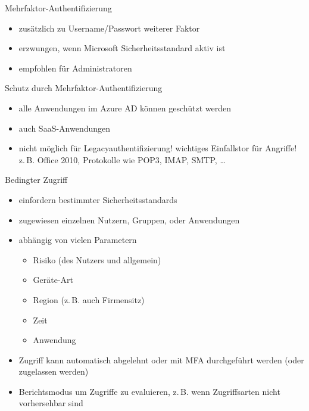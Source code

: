 
\begin{flashcard}[Definition]{Mehrfaktor-Authentifizierung}
  \begin{itemize}
    \item zusätzlich zu Username/Passwort weiterer Faktor
    \item erzwungen, wenn Microsoft Sicherheitsstandard aktiv ist
    \item empfohlen für Administratoren
  \end{itemize}
\end{flashcard}

\begin{flashcard}[Definition]{Schutz durch Mehrfaktor-Authentifizierung}
  \begin{itemize}
    \item alle Anwendungen im Azure AD können geschützt werden
    \item auch SaaS-Anwendungen
    \item nicht möglich für Legacyauthentifizierung!\newline
    wichtiges Einfallstor für Angriffe!\newline
    z.\,B. Office 2010, Protokolle wie POP3, IMAP, SMTP, \ldots
  \end{itemize}
\end{flashcard}

\begin{flashcard}[Definition]{Bedingter Zugriff}
  \begin{itemize}
    \item einfordern bestimmter Sicherheitsstandards
    \item zugewiesen einzelnen Nutzern, Gruppen, oder Anwendungen
    \item abhängig von vielen Parametern
      \begin{itemize}
        \item Risiko (des Nutzers und allgemein)
        \item Geräte-Art
        \item Region (z.\,B. auch Firmensitz)
        \item Zeit
        \item Anwendung
      \end{itemize}
    \item Zugriff kann automatisch abgelehnt oder mit MFA durchgeführt werden\newline
      (oder zugelassen werden)
    \item Berichtsmodus um Zugriffe zu evaluieren, z.\,B. wenn Zugriffsarten nicht vorhersehbar sind
  \end{itemize}
\end{flashcard}

